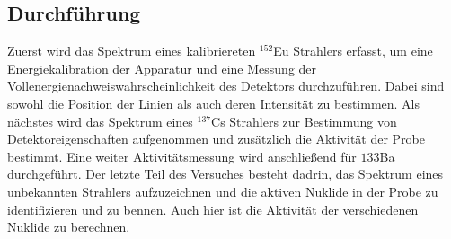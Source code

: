 \cite{aufbau}
\subsection{Durchführung}
Zuerst wird das Spektrum eines kalibriereten $^{152}$Eu Strahlers erfasst, um eine Energiekalibration der Apparatur und eine Messung der
Vollenergienachweiswahrscheinlichkeit des Detektors durchzuführen. Dabei sind sowohl die Position der Linien als auch deren Intensität zu bestimmen.
Als nächstes wird das Spektrum eines $^{137}$Cs Strahlers zur Bestimmung von Detektoreigenschaften aufgenommen und zusätzlich die Aktivität der Probe
bestimmt. Eine weiter Aktivitätsmessung wird anschließend für ${133}$Ba durchgeführt. Der letzte Teil des Versuches besteht dadrin, das Spektrum eines
unbekannten Strahlers aufzuzeichnen und die aktiven Nuklide in der Probe zu identifizieren und zu bennen. Auch hier ist die Aktivität der 
verschiedenen Nuklide zu berechnen.



